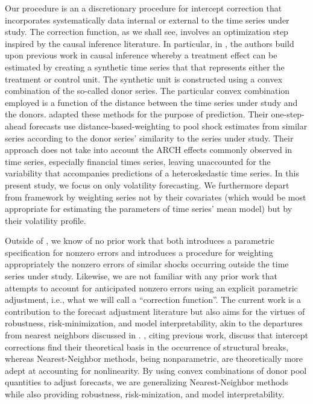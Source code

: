 \documentclass[11pt,3p,review,authoryear]{elsarticle}
\theoremstyle{definition}
\begin{document}
Our procedure is an a discretionary procedure for intercept correction that  incorporates systematically data internal or external to the time series under study.  The correction function, as we shall see, involves an optimization step inspired by the causal inference literature.  In particular, in \citet{abadie2010synthetic}, the authors build upon previous work in causal inference whereby a treatment effect can be estimated by creating a synthetic time series that that represents either the treatment or control unit.  The synthetic unit is constructed using a convex combination of the so-called donor series.  The particular convex combination employed is a function of the distance between the time series under study and the donors.  \citet{lin2021minimizing} adapted these methods for the purpose of prediction.  Their one-step-ahead forecasts use distance-based-weighting to pool shock estimates from similar series according to the donor series' similarity to the series under study.  Their approach does not take into account the ARCH effects commonly observed in time series, especially financial times series, leaving unaccounted for the variability that accompanies predictions of a heteroskedastic time series.  In this present study, we focus on only volatility forecasting.  We furthermore depart from \citet{lin2021minimizing} framework by weighting series not by their covariates (which would be most appropriate for estimating the parameters of time series' mean model) but by their volatility profile.  

Outside of \citet{lin2021minimizing}, we know of no prior work that both introduces a parametric specification for nonzero errors and introduces a procedure for weighting appropriately the nonzero errors of similar shocks occurring outside the time series under study.  Likewise, we are not familiar with any prior work that attempts to account for anticipated nonzero errors using an explicit parametric adjustment, i.e., what we will call a ``correction function''.  The current work is a contribution to the forecast adjustment literature but also aims for the virtues of robustness, risk-minimization, and model interpretability, akin to the departures from nearest neighbors discussed in \citet{abadie2021penalized}.  \citet{guerron2017macroeconomic}, citing previous work, discuss that intercept corrections find their theoretical basis in the occurrence of structural breaks, whereas Nearest-Neighbor methods, being nonparametric, are theoretically more adept at accounting for nonlinearity.  By using convex combinations of donor pool quantities to adjust forecasts, we are generalizing Nearest-Neighbor methods while also providing robustness, risk-minization, and model interpretability.
\end{document}
